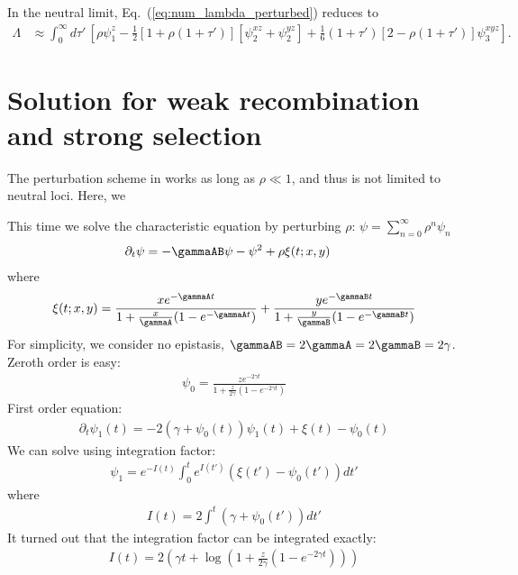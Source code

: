 \documentclass[aps,rmp,twocolumn,groupedaddress,floatfix,notitlepage]{revtex4-1}
\begin{document}
In the neutral limit, Eq.~(\ref{eq:num_lambda_perturbed}) reduces to 
\begin{align}\label{eq:num_lambda_unperturbed}
    \Lambda & \approx  \int_0^{\infty} d\tau'\, \left[ \rho \psi_1^z - \frac{1}{2}\left[1+\rho(1+\tau')\right]\left[\psi_2^{xz} + \psi_2^{yz}\right] + \frac{1}{6} (1+\tau') \left[2-\rho(1+\tau')\right] \psi_3^{xyz} \right].
\end{align}

\section{Solution for weak recombination and strong selection}
\label{appendix:weak-recombination-strong-selection}
The perturbation scheme in  works as long as $\rho\ll 1$, and thus is not limited to neutral loci. Here, we 

This time we solve the characteristic equation by perturbing $\rho$: $\psi = \sum_{n=0}^\infty \rho^n \psi_n$
\begin{align}
    \partial_t \psi &= -\gammaAB \psi - \psi^2 + \rho \xi(t; x, y)
\end{align}
where
\begin{align}
    \xi(t;x,y) = \frac{x e^{-\gammaA t}}{1 + \frac{x}{\gammaA} (1-e^{-\gammaA t})}
    + \frac{y e^{-\gammaB t}}{1 + \frac{y}{\gammaB} (1-e^{-\gammaB t})}
\end{align}
For simplicity, we consider no epistasis, $\gammaAB=2\gammaA=2\gammaB=2\gamma$. Zeroth order is easy:
\begin{align}
    \psi_0 = \frac{z e^{-2\gamma t}}{1 + \frac{z}{2\gamma}(1-e^{-2\gamma t})}
\end{align}
First order equation:
\begin{align}
    \partial_t \psi_1(t) = -2(\gamma + \psi_0(t))\psi_1(t) + \xi(t) - \psi_0(t)
\end{align}
We can solve using integration factor:
\begin{align}
    \psi_1 = e^{-I(t)}\int_0^t e^{I(t')}(\xi(t')-\psi_0(t'))dt'
\end{align}
where 
\begin{align}
    I(t) = 2 \int^t (\gamma + \psi_0(t'))dt'
\end{align}
It turned out that the integration factor can be integrated exactly:
\begin{align}
    I(t) = 2\left(\gamma t + \log\left(1+\frac{z}{2\gamma}(1-e^{-2\gamma t})\right)\right)
\end{align}
\end{document}
